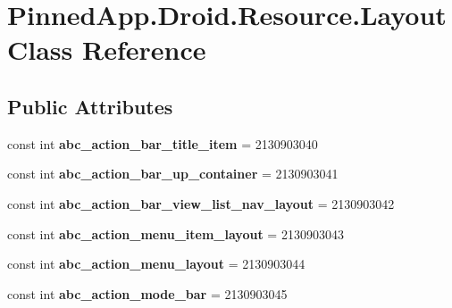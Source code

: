 \hypertarget{class_pinned_app_1_1_droid_1_1_resource_1_1_layout}{}\section{Pinned\+App.\+Droid.\+Resource.\+Layout Class Reference}
\label{class_pinned_app_1_1_droid_1_1_resource_1_1_layout}
\subsection*{Public Attributes}
\begin{DoxyCompactItemize}
\item 
\mbox{\label{class_pinned_app_1_1_droid_1_1_resource_1_1_layout_aa341a0c91254ce4b9fde6b16b2688dec}} 
const int {\bfseries abc\+\_\+action\+\_\+bar\+\_\+title\+\_\+item} = 2130903040
\item 
\mbox{\label{class_pinned_app_1_1_droid_1_1_resource_1_1_layout_a2c10583fbffbcdf8f6172d97fc18d786}} 
const int {\bfseries abc\+\_\+action\+\_\+bar\+\_\+up\+\_\+container} = 2130903041
\item 
\mbox{\label{class_pinned_app_1_1_droid_1_1_resource_1_1_layout_aef013deb4e5903e706eb2b98b084a27b}} 
const int {\bfseries abc\+\_\+action\+\_\+bar\+\_\+view\+\_\+list\+\_\+nav\+\_\+layout} = 2130903042
\item 
\mbox{\label{class_pinned_app_1_1_droid_1_1_resource_1_1_layout_ab7849c19c917a9712789a8445fa11883}} 
const int {\bfseries abc\+\_\+action\+\_\+menu\+\_\+item\+\_\+layout} = 2130903043
\item 
\mbox{\label{class_pinned_app_1_1_droid_1_1_resource_1_1_layout_a92164d6d44b560114be18b467c0b7461}} 
const int {\bfseries abc\+\_\+action\+\_\+menu\+\_\+layout} = 2130903044
\item 
\mbox{\label{class_pinned_app_1_1_droid_1_1_resource_1_1_layout_a235c1ecd5e5439c88b7602b6961be7a4}} 
const int {\bfseries abc\+\_\+action\+\_\+mode\+\_\+bar} = 2130903045

\end{DoxyCompactItemize}
